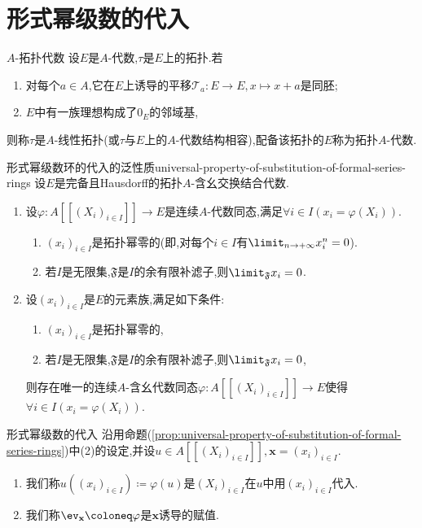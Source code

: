 \section{形式幂级数的代入}

\begin{definition}{$A$-拓扑代数}{}
	设$E$是$A$-代数,$\tau$是$E$上的拓扑.若
	\begin{enumerate}
		\item 对每个$a\in A$,它在$E$上诱导的平移$\mathcal{T}_{a}:E\to E,x\mapsto x+a$是同胚;
		\item $E$中有一族理想构成了$0_{E}$的邻域基,
	\end{enumerate}
	则称$\tau$是$A$-线性拓扑(或$\tau$与$E$上的$A$-代数结构相容),配备该拓扑的$E$称为拓扑$A$-代数.
\end{definition}

\begin{proposition}{形式幂级数环的代入的泛性质}{universal-property-of-substitution-of-formal-series-rings}
	设$E$是完备且Hausdorff的拓扑$A$-含幺交换结合代数.
	\begin{enumerate}
		\item 设$\varphi:A[[(X_{i})_{i\in I}]]\to E$是连续$A$-代数同态,满足$\forall i\in I\left(x_{i}=\varphi\left(X_{i}\right)\right)$.
		\begin{enumerate}
			\item $\left(x_{i}\right)_{i\in I}$是拓扑幂零的(即,对每个$i\in I$有$\limit_{n\to+\infty}x_{i}^{n}=0$).
			\item 若$I$是无限集,$\mathfrak{F}$是$I$的余有限补滤子,则$\limit_{\mathfrak{F}}x_{i}=0$.
		\end{enumerate}
		\item 设$\left(x_{i}\right)_{i\in I}$是$E$的元素族,满足如下条件:
		\begin{enumerate}
			\item $\left(x_{i}\right)_{i\in I}$是拓扑幂零的,
			\item 若$I$是无限集,$\mathfrak{F}$是$I$的余有限补滤子,则$\limit_{\mathfrak{F}}x_{i}=0$,
		\end{enumerate}
		则存在唯一的连续$A$-含幺代数同态$\varphi:A[[(X_{i})_{i\in I}]]\to E$使得$\forall i\in I\left(x_{i}=\varphi\left(X_{i}\right)\right)$.
	\end{enumerate}
\end{proposition}

\begin{definition}{形式幂级数的代入}{}
	沿用命题(\ref{prop:universal-property-of-substitution-of-formal-series-rings})中(2)的设定,并设$u\in A[[(X_{i})_{i\in I}]],\mathbf{x}=\left(x_{i}\right)_{i\in I}$.
	\begin{enumerate}
		\item 我们称$u\left(\left(x_{i}\right)_{i\in I}\right)\coloneq\varphi\left(u\right)$是$\left(X_{i}\right)_{i\in I}$在$u$中用$\left(x_{i}\right)_{i\in I}$代入.
		\item 我们称$\ev_{\mathbf{x}}\coloneq\varphi$是$\mathbf{x}$诱导的赋值.
	\end{enumerate}
\end{definition}

